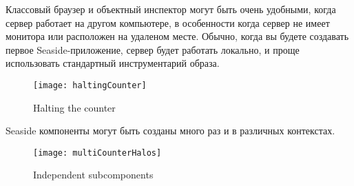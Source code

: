 \documentclass[a4paper,10pt,twoside]{book}
\begin{document}

Классовый браузер и объектный инспектор могут быть очень удобными,
когда сервер работает на другом компьютере,
в особенности когда сервер не имеет монитора или расположен
на удаленом месте.
Обычно, когда вы будете создавать первое Seaside-приложение,
сервер будет работать локально,
и проще использовать стандартный инструментарий образа.

\begin{figure}[ht]
\begin{center}
\texttt{[image: haltingCounter]}
\caption{Halting the counter}
\end{center}
\end{figure}




Seaside компоненты могут быть созданы много раз и в различных контекстах.

\begin{figure}[ht]
\begin{center}
\texttt{[image: multiCounterHalos]}
\caption{Independent subcomponents}
\end{center}
\end{figure}
\end{document}
